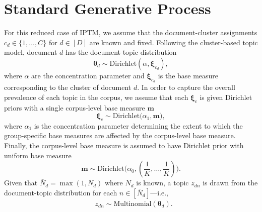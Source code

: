 \documentclass[12pt]{article}
\begin{document}
\maketitle


\section{Standard Generative Process}
For this reduced case of IPTM, we assume that the document-cluster assignments $c_d \in \{1,\ldots, C\}$ for $d \in [D]$ are known and fixed.
Following the cluster-based topic model, document $d$ has the document-topic distribution
\begin{equation}
\boldsymbol{\theta}_d \sim \mbox{Dirichlet}(\alpha, \boldsymbol{\xi}_{c_d}),
\end{equation}
where $\alpha$ are the concentration parameter and $\boldsymbol{\xi}_{c_d}$ is the base measure corresponding to the cluster of document $d$.
In order to capture the overall prevalence of each topic in the corpus, we assume that each $\boldsymbol{\xi}_{c}$ is given Dirichlet priors with a single corpus-level base measure $\boldsymbol{m}$
\begin{equation}
\boldsymbol{\xi}_c\sim \mbox{Dirichlet}\Big(\alpha_1, \boldsymbol{m}\Big),
\end{equation}
where $\alpha_1$ is the concentration parameter determining the extent to which the group-specific base measures are affected by the corpus-level base measure. Finally, the corpus-level base measure is assumed to have Dirichlet prior with uniform base measure
\begin{equation}
\boldsymbol{m}\sim \mbox{Dirichlet}\Big(\alpha_0, (\frac{1}{K},\ldots,\frac{1}{K})\Big).
\end{equation}
Given that $\bar N_d = \max(1, N_d)$ where $N_d$ is known, a topic $z_{dn}$ is drawn from the document-topic distribution for each $n \in [\bar N_d]$---i.e.,
\begin{equation}
\begin{aligned}
&z_{dn} \sim \mbox{Multinomial}(\boldsymbol{\theta}_d).\\
\end{aligned}
\end{equation}
\end{document}
